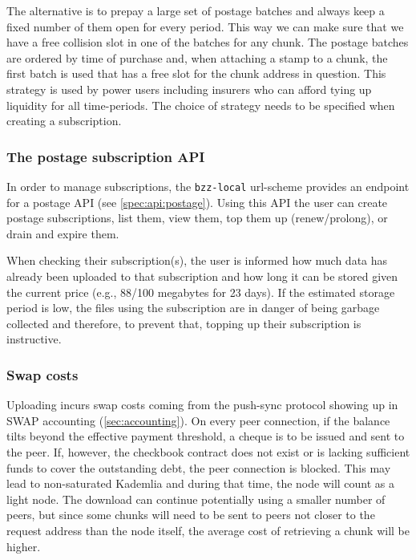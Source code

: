 The alternative is to prepay a large set of postage batches and always keep a fixed number of them open for every period. This way we can make sure that we have a free collision slot in one of the batches for any chunk. The postage batches are ordered by time of purchase and, when attaching a stamp to a chunk, the first batch is used that has a free slot for the chunk address in question. This strategy is used by power users including insurers who can afford tying up liquidity for all time-periods. The choice of strategy needs to be specified when creating a subscription.

\subsubsection{The postage subscription API}

In order to manage subscriptions, the \texttt{bzz-local} url-scheme provides an endpoint for a postage API (see  \ref{spec:api:postage}). Using this API the user can create postage subscriptions, list them, view them, top them up (renew/prolong), or drain and expire them. 

When checking their subscription(s), the user is informed how much data has already been uploaded to that subscription and how long it can be stored given the current price (e.g., 88/100 megabytes for 23 days). If the estimated storage period is low, the files using the subscription are in danger of being garbage collected and therefore, to prevent that, topping up their subscription is instructive.


\subsubsection{Swap costs}

Uploading incurs swap costs coming from the push-sync protocol showing up in SWAP accounting (\ref{sec:accounting}). On every peer connection, if the balance tilts beyond the effective payment threshold, a cheque is to be issued and sent to the peer. If, however, the checkbook contract does not exist or is lacking sufficient funds to cover the outstanding debt, the peer connection is blocked. This may lead to non-saturated Kademlia and during that time, the node will count as a light node. The download can continue potentially using a smaller number of peers, but since some chunks will need to be sent to peers not closer to the request address than the node itself, the average cost of retrieving a chunk will be higher. 

